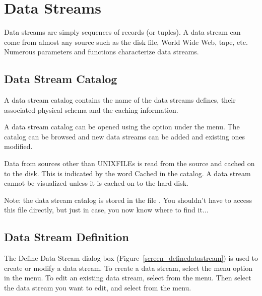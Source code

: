 
\section{Data Streams}
\label{sect:data_streams}

Data streams are simply sequences of records (or tuples). A data stream can
come from almost any source such as the disk file, World Wide Web, tape, etc.
Numerous parameters and functions characterize data streams.


\subsection{Data Stream Catalog}

A data stream catalog contains the name of the data streams defines, their
associated physical schema and the caching information.

A data stream catalog can be opened using the  option
under the 
menu. The catalog can be browsed and new data streams can be added and existing
ones modified.

Data from sources other than UNIXFILEs is read from the source and cached
on to the disk. This is indicated by the word Cached in the catalog. A data
stream cannot be visualized unless it is cached on to the hard disk.

Note: the data stream catalog is stored in the file
.  You shouldn't have to access this
file directly, but just in case, you now know where to find it...


\subsection{Data Stream Definition}

The Define Data Stream dialog box (Figure~\ref{screen_definedatastream}) is
used to create or modify a data stream. To create a data stream, select the
 menu option in the  menu.  To edit an existing
data stream, select  from the  menu.  Then
select the data stream you want to edit, and select  from the
 menu.

